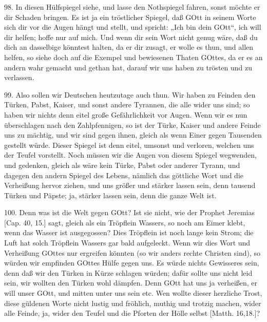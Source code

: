 98. In diesen Hülfspiegel siehe, und lasse den Nothspiegel fahren, sonst möchte er dir Schaden bringen. Es ist ja ein tröstlicher Spiegel, daß GOtt in seinem Worte sich dir vor die Augen hängt und stellt, und spricht: „Ich bin dein GOtt“, ich will dir helfen; hoffe nur auf mich. Und wenn dir sein Wort nicht genug wäre, daß du dich an dasselbige könntest halten, da er dir zusagt, er wolle es thun, und allen helfen, so siehe doch auf die Exempel und bewiesenen Thaten GOttes, da er es an andern wahr gemacht und gethan hat, darauf wir uns haben zu trösten und zu verlassen.

99. Also sollen wir Deutschen heutzutage auch thun. Wir haben zu Feinden den Türken, Pabst, Kaiser, und sonst andere Tyrannen, die alle wider uns sind; so haben wir nichts denn eitel große Gefährlichkeit vor Augen. Wenn wir es nun überschlagen nach den Zahlpfennigen, so ist der Türke, Kaiser und andere Feinde uns zu mächtig, und wir sind gegen ihnen, gleich als wenn Einer gegen Tausenden gestellt würde. Dieser Spiegel ist denn eitel, umsonst und verloren, welchen uns der Teufel vorstellt. Noch müssen wir die Augen von diesem Spiegel wegwenden, und gedenken, gleich als wäre kein Türke, Pabst oder anderer Tyrann, und dagegen den andern Spiegel des Lebens, nämlich das göttliche Wort und die Verheißung hervor ziehen, und uns größer und stärker lassen sein, denn tausend Türken und Päpste; ja, stärker lassen sein, denn die ganze Welt ist.

100. Denn was ist die Welt gegen GOtt? Ist sie nicht, wie der Prophet Jeremias [Cap. 40, 15.] sagt, gleich als ein Tröpflein Wassers, so noch am Eimer klebt, wenn das Wasser ist ausgegossen? Dies Tröpflein ist noch lange kein Strom; die Luft hat solch Tröpflein Wassers gar bald aufgeleckt. Wenn wir dies Wort und Verheißung GOttes nur ergreifen könnten (so wir anders rechte Christen sind), so würden wir empfinden GOttes Hülfe gegen uns. Es würde nichts Gewisseres sein, denn daß wir den Türken in Kürze schlagen würden; dafür sollte uns nicht leid sein, wir wollten den Türken wohl dämpfen. Denn GOtt hat uns ja verheißen, er will unser GOtt, und mitten unter uns sein etc. Wen wollte dieser herzliche Trost, diese güldenen Worte nicht lustig und fröhlich, muthig und trotzig machen, wider alle Feinde, ja, wider den Teufel und die Pforten der Hölle selbst [Matth. 16,18.]?

